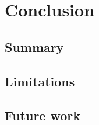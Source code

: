 \chapter{Conclusion}
\label{ch:conclusion}

\section{Summary}
\label{sec:concl-summary}

\section{Limitations}
\label{sec:concl-limitations}

\section{Future work}
\label{sec:concl-future}

